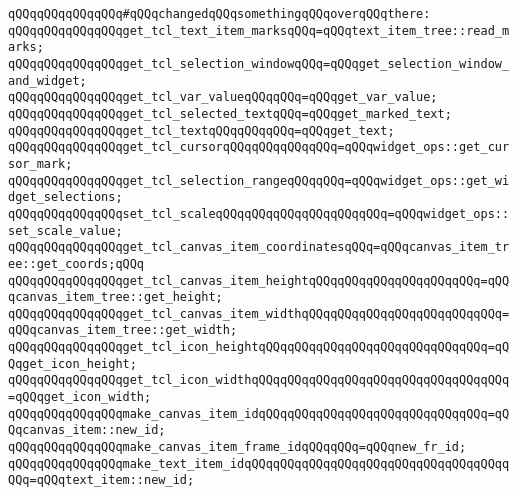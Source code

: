 \verb|qQQqqQQqqQQqqQQq#qQQqchangedqQQqsomethingqQQqoverqQQqthere:|\newline
\newline
\verb|qQQqqQQqqQQqqQQqget_tcl_text_item_marksqQQq=qQQqtext_item_tree::read_marks;|\newline
\newline
\newline
\verb|qQQqqQQqqQQqqQQqget_tcl_selection_windowqQQq=qQQqget_selection_window_and_widget;|\newline
\verb|qQQqqQQqqQQqqQQqget_tcl_var_valueqQQqqQQq=qQQqget_var_value;|\newline
\verb|qQQqqQQqqQQqqQQqget_tcl_selected_textqQQq=qQQqget_marked_text;|\newline
\verb|qQQqqQQqqQQqqQQqget_tcl_textqQQqqQQqqQQq=qQQqget_text;|\newline
\newline
\verb|qQQqqQQqqQQqqQQqget_tcl_cursorqQQqqQQqqQQqqQQq=qQQqwidget_ops::get_cursor_mark;|\newline
\verb|qQQqqQQqqQQqqQQqget_tcl_selection_rangeqQQqqQQq=qQQqwidget_ops::get_widget_selections;|\newline
\verb|qQQqqQQqqQQqqQQqset_tcl_scaleqQQqqQQqqQQqqQQqqQQqqQQq=qQQqwidget_ops::set_scale_value;|\newline
\newline
\verb|qQQqqQQqqQQqqQQqget_tcl_canvas_item_coordinatesqQQq=qQQqcanvas_item_tree::get_coords;qQQq|\newline
\verb|qQQqqQQqqQQqqQQqget_tcl_canvas_item_heightqQQqqQQqqQQqqQQqqQQqqQQq=qQQqcanvas_item_tree::get_height;|\newline
\verb|qQQqqQQqqQQqqQQqget_tcl_canvas_item_widthqQQqqQQqqQQqqQQqqQQqqQQqqQQq=qQQqcanvas_item_tree::get_width;|\newline
\newline
\verb|qQQqqQQqqQQqqQQqget_tcl_icon_heightqQQqqQQqqQQqqQQqqQQqqQQqqQQqqQQq=qQQqget_icon_height;|\newline
\verb|qQQqqQQqqQQqqQQqget_tcl_icon_widthqQQqqQQqqQQqqQQqqQQqqQQqqQQqqQQqqQQq=qQQqget_icon_width;|\newline
\newline
\verb|qQQqqQQqqQQqqQQqmake_canvas_item_idqQQqqQQqqQQqqQQqqQQqqQQqqQQqqQQq=qQQqcanvas_item::new_id;|\newline
\verb|qQQqqQQqqQQqqQQqmake_canvas_item_frame_idqQQqqQQq=qQQqnew_fr_id;|\newline
\verb|qQQqqQQqqQQqqQQqmake_text_item_idqQQqqQQqqQQqqQQqqQQqqQQqqQQqqQQqqQQqqQQq=qQQqtext_item::new_id;|\newline
